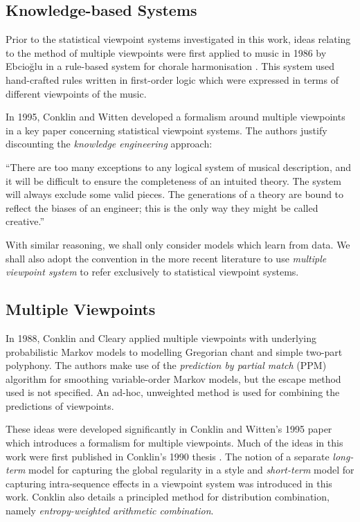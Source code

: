 \documentclass[12pt,a4paper,twoside,openright]{report}
\begin{document}
\subsection{Knowledge-based Systems}

Prior to the statistical viewpoint systems investigated in this work, ideas
relating to the method of multiple viewpoints were first applied to music in
1986 by Ebcioğlu in a rule-based system for chorale harmonisation
\cite{ebcioglu1986expert}. This system used hand-crafted rules written in
first-order logic which were expressed in terms of different viewpoints of the
music. 

In 1995, Conklin and Witten \cite{conklin1995viewpoints} developed a formalism
around multiple viewpoints in a key paper concerning statistical viewpoint
systems.  The authors justify discounting the \emph{knowledge engineering}
approach:

\begin{displayquote}
``There are too many exceptions to any
logical system of musical description, and it will be difficult to ensure the
completeness of an intuited theory. The system will always exclude some valid
pieces. The generations of a theory are bound to reflect the biases of an
engineer; this is the only way they might be called creative.''
\end{displayquote}

With similar reasoning, we shall only consider models which learn from data. We
shall also adopt the convention in the more recent literature to use
\emph{multiple viewpoint system} to refer exclusively to statistical viewpoint
systems.

\subsection{Multiple Viewpoints}

In 1988, Conklin and Cleary \cite{conklin1988modelling} applied multiple
viewpoints with underlying probabilistic Markov models to modelling Gregorian
chant and simple two-part polyphony. The authors make use of the
\emph{prediction by partial match} (PPM) algorithm \cite{cleary1984ppm} for
smoothing variable-order Markov models, but the escape method used is not
specified.  An ad-hoc, unweighted method is used for combining the predictions
of viewpoints.

These ideas were developed significantly in Conklin and Witten's 1995 paper
which introduces a formalism for multiple viewpoints. Much of the ideas in this
work were first published in Conklin's 1990 thesis \cite{conklin1990prediction}.
The notion of a separate \emph{long-term} model for capturing the global
regularity in a style and \emph{short-term} model for capturing intra-sequence
effects in a viewpoint system was introduced in this work. Conklin also details
a principled method for distribution combination, namely \emph{entropy-weighted
arithmetic combination}. 
\end{document}
